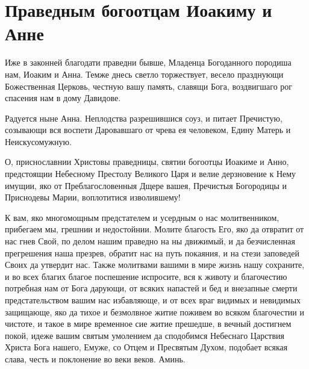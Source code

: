\section{Праведным богоотцам Иоакиму и Анне}\begin{mymulticols}




Иже в законней благодати праведни бывше, Младенца Богоданного породиша нам, Иоаким и Анна. Темже днесь светло торжествует, весело празднующи Божественная Церковь, честную вашу память, славящи Бога, воздвигшаго рог спасения нам в дому Давидове.




Радуется ныне Анна. Неплодства разрешившися соуз, и питает Пречистую, созывающи вся воспети Даровавшаго от чрева ея человеком, Едину Матерь и Неискусомужную.




О, приснославнии Христовы праведницы, святии богоотцы Иоакиме и Анно, предстоящии Небесному Престолу Великого Царя и велие дерзновение к Нему имущии, яко от Преблагословенныя Дщере вашея, Пречистыя Богородицы и Приснодевы Марии, воплотитися изволившему!

К вам, яко многомощным предстателем и усердным о нас молитвенником, прибегаем мы, грешнии и недостойнии. Молите благость Его, яко да отвратит от нас гнев Свой, по делом нашим праведно на ны движимый, и да безчисленная прегрешения наша презрев, обратит нас на путь покаяния, и на стези заповедей Своих да утвердит нас. Также молитвами вашими в мире жизнь нашу сохраните, и во всех благих благое поспешение испросите, вся к животу и благочестию потребная нам от Бога дарующи, от всяких напастей и бед и внезапные смерти предстательством вашим нас избавляюще, и от всех враг видимых и невидимых защищающе, яко да тихое и безмолвное житие поживем во всяком благочестии и чистоте, и такое в мире временное сие житие прешедше, в вечный достигнем покой, идеже вашим святым умолением да сподобимся Небеснаго Царствия Христа Бога нашего, Емуже, со Отцем и Пресвятым Духом, подобает всякая слава, честь и поклонение во веки веков. Аминь.


\end{mymulticols}

